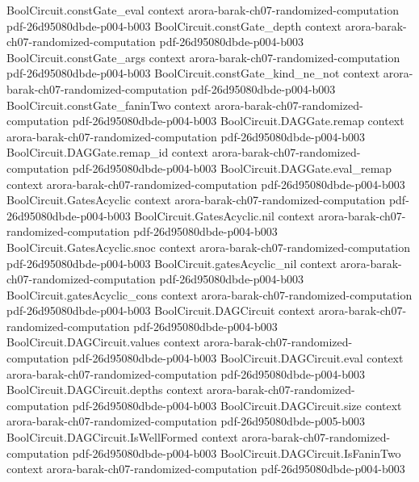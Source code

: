 \begin{theorem}
  {BoolCircuit.constGate_eval}
  {context}
  {arora-barak-ch07-randomized-computation}
  {pdf-26d95080dbde-p004-b003}
\proofstep
  {BoolCircuit.constGate_depth}
  {context}
  {arora-barak-ch07-randomized-computation}
  {pdf-26d95080dbde-p004-b003}
\proofstep
  {BoolCircuit.constGate_args}
  {context}
  {arora-barak-ch07-randomized-computation}
  {pdf-26d95080dbde-p004-b003}
\proofstep
  {BoolCircuit.constGate_kind_ne_not}
  {context}
  {arora-barak-ch07-randomized-computation}
  {pdf-26d95080dbde-p004-b003}
\proofstep
  {BoolCircuit.constGate_faninTwo}
  {context}
  {arora-barak-ch07-randomized-computation}
  {pdf-26d95080dbde-p004-b003}
\proofstep
  {BoolCircuit.DAGGate.remap}
  {context}
  {arora-barak-ch07-randomized-computation}
  {pdf-26d95080dbde-p004-b003}
\proofstep
  {BoolCircuit.DAGGate.remap_id}
  {context}
  {arora-barak-ch07-randomized-computation}
  {pdf-26d95080dbde-p004-b003}
\proofstep
  {BoolCircuit.DAGGate.eval_remap}
  {context}
  {arora-barak-ch07-randomized-computation}
  {pdf-26d95080dbde-p004-b003}
\proofstep
  {BoolCircuit.GatesAcyclic}
  {context}
  {arora-barak-ch07-randomized-computation}
  {pdf-26d95080dbde-p004-b003}
\proofstep
  {BoolCircuit.GatesAcyclic.nil}
  {context}
  {arora-barak-ch07-randomized-computation}
  {pdf-26d95080dbde-p004-b003}
\proofstep
  {BoolCircuit.GatesAcyclic.snoc}
  {context}
  {arora-barak-ch07-randomized-computation}
  {pdf-26d95080dbde-p004-b003}
\proofstep
  {BoolCircuit.gatesAcyclic_nil}
  {context}
  {arora-barak-ch07-randomized-computation}
  {pdf-26d95080dbde-p004-b003}
\proofstep
  {BoolCircuit.gatesAcyclic_cons}
  {context}
  {arora-barak-ch07-randomized-computation}
  {pdf-26d95080dbde-p004-b003}
\proofstep
  {BoolCircuit.DAGCircuit}
  {context}
  {arora-barak-ch07-randomized-computation}
  {pdf-26d95080dbde-p004-b003}
\proofstep
  {BoolCircuit.DAGCircuit.values}
  {context}
  {arora-barak-ch07-randomized-computation}
  {pdf-26d95080dbde-p004-b003}
\proofstep
  {BoolCircuit.DAGCircuit.eval}
  {context}
  {arora-barak-ch07-randomized-computation}
  {pdf-26d95080dbde-p004-b003}
\proofstep
  {BoolCircuit.DAGCircuit.depths}
  {context}
  {arora-barak-ch07-randomized-computation}
  {pdf-26d95080dbde-p004-b003}
\proofstep
  {BoolCircuit.DAGCircuit.size}
  {context}
  {arora-barak-ch07-randomized-computation}
  {pdf-26d95080dbde-p005-b003}
\proofstep
  {BoolCircuit.DAGCircuit.IsWellFormed}
  {context}
  {arora-barak-ch07-randomized-computation}
  {pdf-26d95080dbde-p004-b003}
\proofstep
  {BoolCircuit.DAGCircuit.IsFaninTwo}
  {context}
  {arora-barak-ch07-randomized-computation}
  {pdf-26d95080dbde-p004-b003}

\end{theorem}
